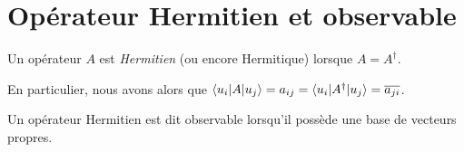 \documentclass[../notesdecours.tex]{subfiles}
\begin{document}
\section{Opérateur Hermitien et observable}
\begin{definition}
Un opérateur $A$ est \emph{Hermitien} (ou encore Hermitique) lorsque $A = A^\dag$.
\end{definition}
\begin{Property}
En particulier, nous avons alors que $\braket{u_i|A|u_j} = a_{ij} = \braket{u_i|A^\dag|u_j} = \overline{a_{ji}}$.
\end{Property}
\begin{definition}
Un opérateur Hermitien est dit observable lorsqu'il possède une base de vecteurs propres.
\end{definition}
\end{document}
